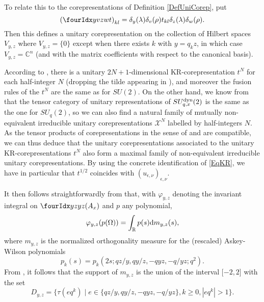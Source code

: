 To relate this to the corepresentations of Definition \ref{DefUniCorep}, put \[\left(\Gr{t}{y}{z}{v}{w}\right)_{kl} = \delta_{y}(\lambda)\delta_v(\rho) t_{kl} \delta_{z}(\lambda)\delta_{w}(\rho).\] Then this defines a unitary corepresentation on the collection of Hilbert spaces $V_{y,z}$ where $V_{y,z}=\{0\}$ except when there exists $k$ with $y = q_kz$,  in which case $V_{y,z} = \mathbb{C}^n$ (and with the matrix coefficients with respect to the canonical basis). 

According to \cite{KoR1}, there is a unitary $2N+1$-dimensional KR-corepresentation $t^N$ for each half-integer $N$ (dropping the tilde appearing in \cite{KoR1}), and moreover the fusion rules of the $t^N$ are the same as for $SU(2)$. On the other hand, we know from \cite[Section 5]{DCT1} that the tensor category of unitary representations of $SU_{q,x}^{\operatorname{\mathrm{dyn}}}(2)$ is the same as the one for $SU_q(2)$, so we can also find a natural family of mutually non-equivalent irreducible unitary corepresentations $\mathscr{X}^{N}$ labelled by half-integers $N$. As the tensor products of corepresentations in the sense of \cite{KoR1} and \cite{DCT1} are compatible, we can thus deduce that the unitary corepresentations associated to the unitary KR-corepresentations $t^N$ also form a maximal family of non-equivalent irreducible unitary corepresentations. By using the concrete identification of \eqref{EqKR}, we have in particular that $t^{1/2}$ coincides with $(u_{\epsilon,\nu})_{\epsilon,\nu}$. 



It then follows straightforwardly from \cite[Section 7]{KoR1} that, with $\varphi_{y,z}$ denoting the invariant integral on $\Gr{(A_x)}{y}{y}{z}{z}$ and $p$ any polynomial,  \[\varphi_{y,z}(p(\Omega)) = \int_{\mathbb{R}} p(s)\mathrm{d} m_{y,z}(s),\] where $m_{y,z}$ is the normalized orthogonality measure for the (rescaled) Askey-Wilson polynomials \[p_k(s) = p_k(2s;qz/y,qy/z,-qyz,-q/yz;q^2).\]  From \cite[Theorem 2.1 and Theorem 2.5]{AsW1}%
, it follows that the support of $m_{y,z}$ is the union of the interval $\lbrack -2,2\rbrack$ with the set \[D_{y,z} = \{\tau(eq^k)\mid e\in \{qz/y,qy/z,-qyz,-q/yz\}, k\geq 0, |eq^k|>1\}.\]

